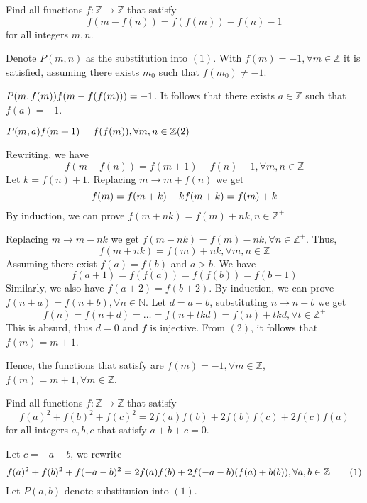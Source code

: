 \documentclass[11pt]{scrartcl}
\begin{document}
\begin{itemize}[label=, leftmargin=0em, itemsep=0.2em]
\begin{sol}
    \end{sol}
     \begin{bt}
        Find all functions $f: \mathbb{Z} \to \mathbb{Z}$ that satisfy
        \[
           f(m - f(n))  = f(f( m)) - f(n) -1\tag{1}
        \]
        for all integers $m,n$.
    \end{bt}
    \begin{sol}
        Denote $P(m,n)$ as the substitution into $(1)$. 
        With $f(m) = -1, \forall m \in \mathbb{Z}$ it is satisfied, assuming there exists $m_0$ such that $f(m_0) \neq -1$.

        $P(m,f(m)) \ra f(m - f(f(m))) = -1$. It follows that there exists $a \in \mathbb{Z}$ such that $f(a) = -1$. 

        $P(m,a) \ra f(m + 1) = f(f(m)), \forall m,n \in \mathbb{Z} (2)$

        Rewriting, we have 
        \[
            f(m - f(n)) = f(m + 1) - f(n) - 1, \forall m,n \in \mathbb{Z}
        \]
        Let $k = f(n) + 1$. Replacing $m \to m + f(n)$ we get 
        \[
            f(m) = f(m + k) - k \lra f(m + k) = f(m) + k
        \]
        By induction, we can prove $f(m + nk) = f(m) + nk, n \in \mathbb{Z^+}$

        Replacing $m \to m - nk$ we get $f(m - nk) = f(m) - nk, \forall n \in \mathbb{Z^+}$. Thus,
        \[
            f(m + nk) = f(m) + nk, \forall m,n \in \mathbb{Z}
        \]
        Assuming there exist $f(a) = f(b)$ and $a > b$. We have 
        \[
            f(a + 1) = f(f(a)) = f(f(b)) = f(b + 1)
        \]
        Similarly, we also have $f(a + 2) = f(b + 2)$. By induction, we can prove $f(n + a) = f(n + b), \forall n \in \mathbb{N}$. Let $d = a - b$, substituting $n \to n - b$ we get 
        \[
            f(n) = f(n + d) = \dots = f(n + tkd) = f(n) + tkd, \forall t \in \mathbb{Z^+}
        \]
        This is absurd, thus $d = 0$ and $f$ is injective. From $(2)$, it follows that $f(m) = m + 1$.

        Hence, the functions that satisfy are $\boxed{f(m) = -1, \forall m \in \mathbb{Z}}$, $\boxed{f(m) = m + 1, \forall m \in \mathbb{Z}}$.

    \end{sol}
    \begin{bt}
        Find all functions $f: \mathbb{Z} \to \mathbb{Z}$ that satisfy
        \[
          f(a)^2 + f(b)^2 + f(c)^2 = 2f(a)f(b) + 2f(b)f(c) + 2f(c)f(a)
        \]
        for all integers $a,b,c$ that satisfy $a + b + c = 0$.
    \end{bt}
    \begin{sol}
        Let \( c = - a - b \), we rewrite
        \[
            f(a)^2 + f(b)^2 + f(-a-b)^2 = 2f(a)f(b) +2f(-a-b)(f(a) + b(b)), \forall a,b \in \mathbb{Z} \tag{1}
        \]
        Let \( P(a,b) \) denote substitution into \( (1) \).


\end{sol}
\end{itemize}
\end{document}
